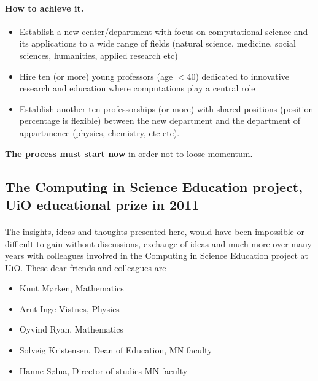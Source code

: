 \documentclass[%
oneside,                 %
final,                   %
10pt]{article}
\begin{document}
\noindent




\paragraph{How to achieve it.}
\begin{itemize}
\item Establish  a new center/department with focus on computational science and its applications to a wide range of fields (natural science, medicine, social sciences, humanities, applied research etc)

\item Hire ten (or more) young professors (age $< 40$) dedicated to innovative research and education where computations play a central role

\item Establish another ten professorships (or more) with  shared positions (position percentage  is flexible) between the  new department and the department of appartanence (physics, chemistry, etc etc).
\end{itemize}

\noindent



\textbf{The process must start now} in order not to loose momentum.



\subsection*{The Computing in Science Education project, UiO educational prize in 2011}

\paragraph{}
The insights, ideas and thoughts presented here, would have been impossible or difficult to gain without discussions, exchange of ideas and much more over many years with colleagues involved in the \href{{http://www.mn.uio.no/english/about/collaboration/cse/}}{Computing in Science Education} project at UiO. These dear friends and colleagues  are 
\begin{itemize}
\item Knut Mørken, Mathematics

\item Arnt Inge Vistnes, Physics

\item Oyvind Ryan, Mathematics

\item Solveig Kristensen, Dean of Education, MN faculty

\item Hanne Sølna, Director of studies MN faculty
\end{itemize}

\noindent












\printindex
\end{document}
